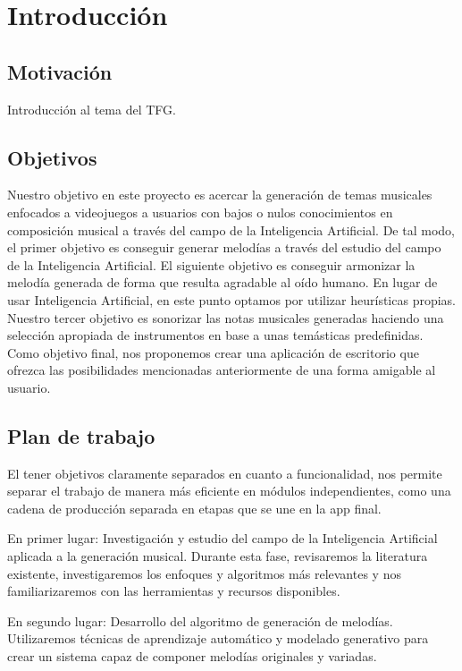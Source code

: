 \chapter{Introducción}
\label{cap:introduccion}



\section{Motivación}
Introducción al tema del TFG.


\section{Objetivos}
 Nuestro objetivo en este proyecto es acercar la generación de temas musicales enfocados a videojuegos a usuarios con bajos o nulos conocimientos en composición musical a través del campo de la Inteligencia Artificial.
 De tal modo, el primer objetivo es conseguir generar melodías a través del estudio del campo de la Inteligencia Artificial.
 El siguiente objetivo es conseguir armonizar la melodía generada de forma que resulta agradable al oído humano. En lugar de usar Inteligencia Artificial, en este punto optamos por utilizar heurísticas propias.
 Nuestro tercer objetivo es sonorizar las notas musicales generadas haciendo una selección apropiada de instrumentos en base a unas temásticas predefinidas.
 Como objetivo final, nos proponemos crear una aplicación de escritorio que ofrezca las posibilidades mencionadas anteriormente de una forma amigable al usuario.

\section{Plan de trabajo}
El tener objetivos claramente separados en cuanto a funcionalidad, nos permite separar el trabajo de manera más eficiente en módulos independientes, como una cadena de producción separada en etapas que se une en la app final. 

En primer lugar: Investigación y estudio del campo de la Inteligencia Artificial aplicada a la generación musical. Durante esta fase, revisaremos la literatura existente, investigaremos los enfoques y algoritmos más relevantes y nos familiarizaremos con las herramientas y recursos disponibles.

En segundo lugar: Desarrollo del algoritmo de generación de melodías. Utilizaremos técnicas de aprendizaje automático y modelado generativo para crear un sistema capaz de componer melodías originales y variadas.

